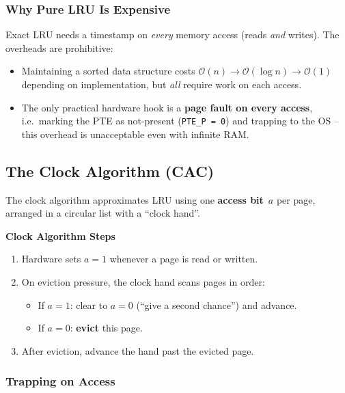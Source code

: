 \documentclass[11pt,a4paper]{article}
\newcommand{\term}[1]{\textbf{#1}}
\newcommand{\code}[1]{\texttt{#1}}
\begin{document}
\subsubsection{Why Pure LRU Is Expensive}

Exact LRU needs a timestamp on \emph{every} memory access (reads \emph{and}
writes).  The overheads are prohibitive:
\begin{itemize}
  \item Maintaining a sorted data structure costs
        $\mathcal{O}(n) \to \mathcal{O}(\log n) \to \mathcal{O}(1)$ depending
        on implementation, but \emph{all} require work on each access.
  \item The only practical hardware hook is a \term{page fault on every access},
        i.e.\ marking the PTE as not-present (\code{PTE\_P = 0}) and trapping
        to the OS -- this overhead is unacceptable even with infinite RAM.
\end{itemize}

\subsection{The Clock Algorithm (CAC)}

The clock algorithm approximates LRU using one \term{access bit}~\(a\) per
page, arranged in a circular list with a ``clock hand''.

\begin{keybox}
\textbf{Clock Algorithm Steps}
\begin{enumerate}[leftmargin=*]
  \item Hardware sets \(a = 1\) whenever a page is read or written.
  \item On eviction pressure, the clock hand scans pages in order:
    \begin{itemize}
      \item If \(a = 1\): clear to \(a = 0\) (``give a second chance'') and
            advance.
      \item If \(a = 0\): \textbf{evict} this page.
    \end{itemize}
  \item After eviction, advance the hand past the evicted page.
\end{enumerate}
\end{keybox}

\subsubsection{Trapping on Access}
\end{document}
